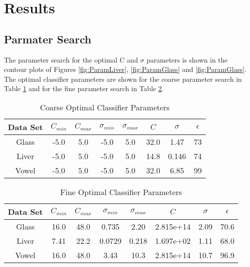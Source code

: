 \section{Results}
\label{sec:Results}

\subsection{Parmater Search}

The parameter search for the optimal C and $\sigma$ parameters is shown in the contour plots of Figures \ref{fig:ParamLiver}, \ref{fig:ParamGlass} and \ref{fig:ParamGlass}.
The optimal classifier parameters are shown for the coarse parameter search in Table \ref{tab:CoarseParamValues} and for the fine parameter search in Table \ref{tab:FineParamValues}.
\begin{table}[ht!]
\caption{Coarse Optimal Classifier Parameters}
\label{tab:CoarseParamValues}
\begin{tabular}{c c c c c c c c}
\hline
Data Set & $C_{min}$ & $C_{max}$ & $\sigma_{min}$ & $\sigma_{max}$ & $C$ & $\sigma$ & $\epsilon$ \\
\hline
Glass &	-5.0 &  5.0 &	-5.0 &	5.0 & 32.0 &	1.47 & 73 \\
Liver &	-5.0 &	5.0 &	-5.0 &	5.0 & 14.8 &	0.146 & 74 \\
Vowel &	-5.0 &	5.0 &	-5.0 &	5.0 & 32.0 &	6.85  & 99 \\
\hline
\end{tabular}
\end{table}
\begin{table}[ht!]
\caption{Fine Optimal Classifier Parameters}
\label{tab:FineParamValues}
\begin{tabular}{c c c c c c c c}
\hline
Data Set & $C_{min}$ & $C_{max}$ & $\sigma_{min}$ & $\sigma_{max}$ & $C$ & $\sigma$ & $\epsilon$ \\
\hline
Glass & 16.0 &	48.0 &	0.735 & 2.20 & 2.815e+14	& 2.09 & 70.6 \\
Liver & 7.41 &	22.2 &	0.0729 & 0.218 &	1.697e+02 &	1.11 & 68.0 \\
Vowel & 16.0 &	48.0 & 3.43 & 10.3 &	2.815e+14 &	10.7 & 96.9 \\
\hline
\end{tabular}
\end{table}
